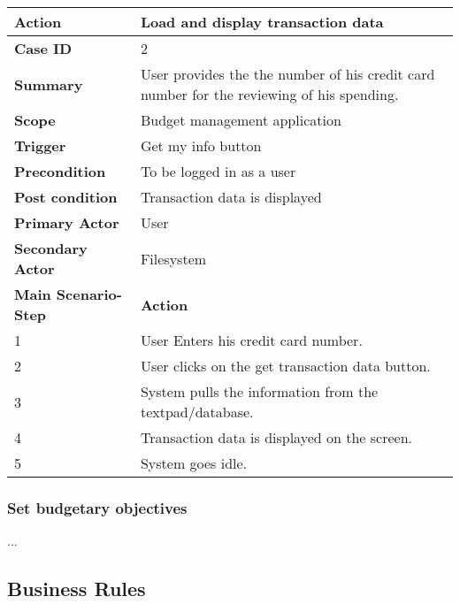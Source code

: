 \documentclass[letterpaper]{article}
\begin{document}
		\begin{center}
        \begin{tabular}{ | m{5cm} | m{10cm}| } 
            \hline
            \textbf{Action} & Load and display transaction data \\ 
            \hline
            \textbf{Case ID} & 2 \\ 
            \hline
            \textbf{Summary} & User provides the the number of his credit card number for the reviewing of his spending. \\
            \hline
            \textbf{Scope} & Budget management application \\ 
            \hline
            \textbf{Trigger} & Get my info button \\
            \hline
            \textbf{Precondition} & To be logged in as a user \\ 
            \hline
            \textbf{Post condition} & Transaction data is displayed \\ 
            \hline
            \textbf{Primary Actor} & User \\ 
            \hline
            \textbf{Secondary Actor} & Filesystem \\ 
            \hline
            \textbf{Main Scenario-Step} & \textbf{Action} \\ 
            \hline
            1 & User Enters his credit card number. \\ 
            \hline
            2 & User clicks on the get transaction data button. \\ 
            \hline
            3 & System pulls the information from the textpad/database. \\ 
            \hline
            4 & Transaction data is displayed on the screen. \\ 
            \hline
            5 & System goes idle. \\ 
            \hline
        \end{tabular}
        \end{center}
        
		\subsubsection{Set budgetary objectives}
		
			...
	
	\subsection{Business Rules}
	
\end{document}
